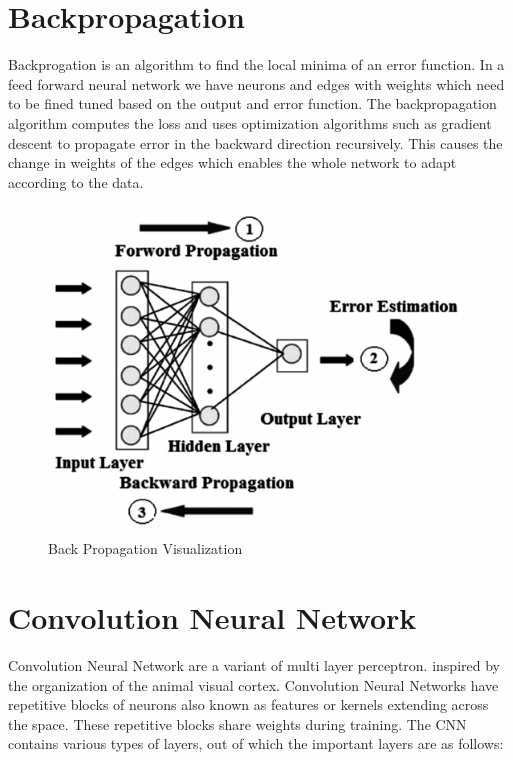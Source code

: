 \section{Backpropagation}
 Backprogation\cite{rumelhart1988learning} is an algorithm to find the local minima of an error function. In a feed forward neural network we have neurons and edges with weights which need to be fined tuned based on the output and error function.  The backpropagation algorithm computes the loss and uses  optimization algorithms such as gradient descent to propagate error in the backward direction recursively. This causes the change in weights of the edges which enables the whole network to adapt according to the data.  
\begin{figure}[H]
  \centering
    \includegraphics[scale=.4, angle=0]{Files/BackPropagation.png}
    \caption[Back Propagation Visualization]{Back Propagation Visualization}
    \label{fig:FFNN}
\end{figure}

\section{Convolution Neural Network}

Convolution Neural Network are a variant of multi layer perceptron. inspired by the organization of the animal visual cortex. Convolution Neural Networks have repetitive blocks of neurons also known as features or kernels extending across the space. These repetitive blocks share weights during training. The CNN contains various types of layers, out of which the important layers are  as follows:

